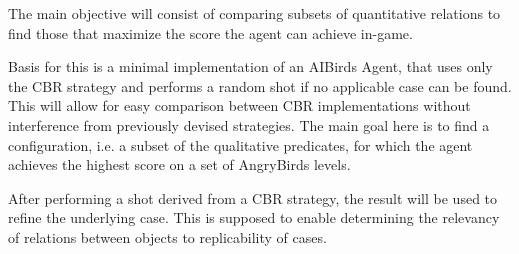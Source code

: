 The main objective will consist of comparing subsets of quantitative relations to find those that maximize the score the agent can achieve in-game. %

Basis for this is a minimal implementation of an AIBirds Agent, that uses only the CBR strategy and performs a random
shot if no applicable case can be found.
This will allow for easy comparison between CBR implementations without interference from previously devised strategies.
The main goal here is to find a configuration, i.e. a subset of the qualitative predicates, for which the agent achieves the highest score on a set of AngryBirds levels.

After performing a shot derived from a CBR strategy, the result will be used to refine the underlying case.
This is supposed to enable determining the relevancy of relations between objects to replicability of cases.